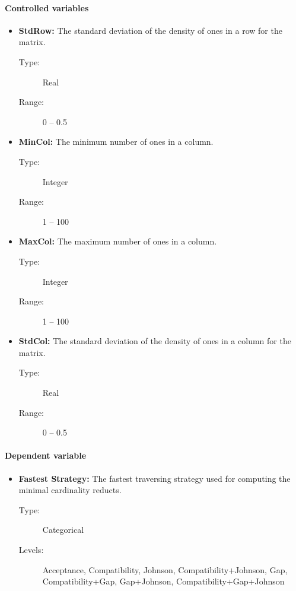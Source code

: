 \documentclass[11pt]{article}   %
\begin{document}
    \paragraph{Controlled variables}  
  	\begin{itemize}
  	   \item \textbf{StdRow:} The standard deviation of the density of ones in a row for the matrix.
  	   		\begin{description}
  	   			\item[Type:] Real
  	   			\item[Range:] 0 -- 0.5
  	   		\end{description}
  	   \item \textbf{MinCol:} The minimum number of ones in a column.
  	   		\begin{description}
  	   			\item[Type:] Integer
  	   			\item[Range:] 1 -- 100
  	   		\end{description}
  	   \item \textbf{MaxCol:} The maximum number of ones in a column.
  	   		\begin{description}
  	   			\item[Type:] Integer
  	   			\item[Range:] 1 -- 100
  	   		\end{description}
  	   \item \textbf{StdCol:} The standard deviation of the density of ones in a column for the matrix.
  	   		\begin{description}
  	   			\item[Type:] Real
  	   			\item[Range:] 0 -- 0.5
  	   		\end{description}
    \end{itemize}
    \paragraph{Dependent variable}  
  	\begin{itemize}
  	   \item \textbf{Fastest Strategy:} The fastest traversing strategy used for computing the minimal cardinality
  	   								    reducts.
  	   		\begin{description}
  	   			\item[Type:] Categorical
  	   			\item[Levels:] Acceptance, Compatibility, Johnson, Compatibility+Johnson, Gap, Compatibility+Gap,
  	   						   Gap+Johnson, Compatibility+Gap+Johnson
  	   		\end{description}
    \end{itemize}
  
\end{document}
